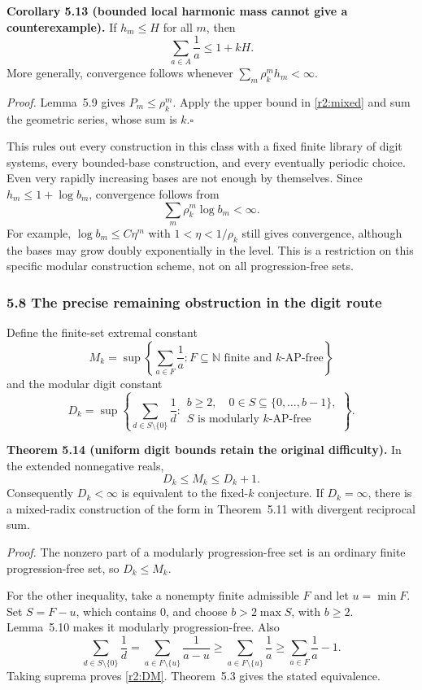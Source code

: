 \medskip
\noindent\textbf{Corollary 5.13 (bounded local harmonic mass cannot give a counterexample).}
If $h_m\le H$ for all $m$, then
\[
\sum_{a\in A}\frac1a\le1+kH.
\]
More generally, convergence follows whenever $\sum_m\rho_k^m h_m<\infty$.

\noindent\emph{Proof.}
Lemma~5.9 gives $P_m\le\rho_k^m$. Apply the upper bound in \eqref{r2:mixed} and sum the geometric series, whose sum is $k$.\hfill$\square$

This rules out every construction in this class with a fixed finite library of digit systems, every bounded-base construction, and every eventually periodic choice. Even very rapidly increasing bases are not enough by themselves. Since $h_m\le1+\log b_m$, convergence follows from
\[
\sum_m\rho_k^m\log b_m<\infty.
\]
For example, $\log b_m\le C\eta^m$ with $1<\eta<1/\rho_k$ still gives convergence, although the bases may grow doubly exponentially in the level. This is a restriction on this specific modular construction scheme, not on all progression-free sets.

\subsubsection{5.8 The precise remaining obstruction in the digit route}

Define the finite-set extremal constant
\[
M_k=\sup\left\{\sum_{a\in F}\frac1a:
 F\subseteq\mathbb N\text{ finite and }k\text{-AP-free}\right\}
\]
and the modular digit constant
\[
D_k=\sup\left\{\sum_{d\in S\setminus\{0\}}\frac1d:
\begin{array}{l}
b\ge2,\quad 0\in S\subseteq\{0,\ldots,b-1\},\\
S\text{ is modularly }k\text{-AP-free}
\end{array}\right\}.
\]

\noindent\textbf{Theorem 5.14 (uniform digit bounds retain the original difficulty).}
In the extended nonnegative reals,
\begin{equation}\label{r2:DM}
D_k\le M_k\le D_k+1.
\end{equation}
Consequently $D_k<\infty$ is equivalent to the fixed-$k$ conjecture. If $D_k=\infty$, there is a mixed-radix construction of the form in Theorem~5.11 with divergent reciprocal sum.

\noindent\emph{Proof.}
The nonzero part of a modularly progression-free set is an ordinary finite progression-free set, so $D_k\le M_k$.

For the other inequality, take a nonempty finite admissible $F$ and let $u=\min F$. Set $S=F-u$, which contains $0$, and choose $b>2\max S$, with $b\ge2$. Lemma~5.10 makes it modularly progression-free. Also
\[
\sum_{d\in S\setminus\{0\}}\frac1d
=\sum_{a\in F\setminus\{u\}}\frac1{a-u}
\ge\sum_{a\in F\setminus\{u\}}\frac1a
\ge\sum_{a\in F}\frac1a-1.
\]
Taking suprema proves \eqref{r2:DM}. Theorem~5.3 gives the stated equivalence.

